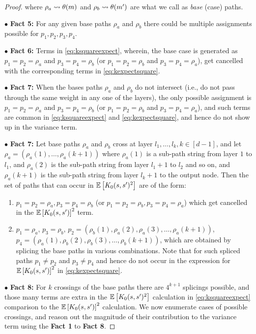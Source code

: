 \begin{proof}
where $\rho_a\rightsquigarrow \theta(m)$ and $\rho_b\rightsquigarrow \theta(m')$ are what we call as \emph{base} (case) paths. 


$\bullet$ \textbf{Fact 5:} For any given base paths $\rho_a$ and $\rho_b$ there could be multiple assignments possible for $p_1,p_2,p_3,p_4$.

$\bullet$ \textbf{Fact 6:}  Terms in \eqref{eq:ksquareexpect}, wherein, the base case is generated as $p_1=p_2=\rho_a$ and $p_3=p_4=\rho_b$ (or $p_1=p_2=\rho_b$ and $p_3=p_4=\rho_a$), get cancelled with the corresponding terms in \eqref{eq:kexpectsquare}.

$\bullet$ \textbf{Fact 7:}  When the bases paths $\rho_a$ and $\rho_b$ do not intersect (i.e., do not pass through the same weight in any one of the layers), the only possible assignment is $p_1=p_2=\rho_a$ and $p_3=p_4=\rho_b$ (or $p_1=p_2=\rho_b$ and $p_3=p_4=\rho_a$), and such terms are common in \eqref{eq:ksquareexpect} and \eqref{eq:kexpectsquare}, and hence do not show up in the variance term.


$\bullet$ \textbf{Fact 7:} Let base paths $\rho_a$ and $\rho_b$ cross at layer $l_1, \ldots, l_k, k \in [d-1]$, and let $\rho_a=(\rho_a(1),\ldots,\rho_a(k+1))$ where $\rho_a(1)$ is a sub-path string from layer $1$ to $l_1$, and $\rho_a(2)$ is the sub-path string from layer $l_1+1$ to $l_2$ and so on, and $\rho_a(k+1)$ is the sub-path string from layer $l_k+1$ to the output node. Then the set of paths that can occur in $\mathbb{E}\left[K_0(s,s')^2\right]$ are of the form:
\begin{enumerate}
\item $p_1=p_2=\rho_a, p_3=p_4=\rho_b$ (or $p_1=p_2=\rho_b, p_3=p_4=\rho_a$) which get cancelled in the $\mathbb{E}\left[K_0(s,s')\right]^2$ term.
\item $p_1=\rho_a$, $p_3=\rho_b$, $p_2=(\rho_b(1),\rho_a(2),\rho_a(3),\ldots,\rho_a(k+1))$, $p_4=(\rho_a(1),\rho_b(2),\rho_b(3),\ldots,\rho_b(k+1))$, which are obtained by splicing the base paths in various combinations. Note that for such spliced paths $p_1\neq p_2$ and $p_3\neq p_4$ and hence do not occur in the expression for $\mathbb{E}\left[K_0(s,s')\right]^2$ in \eqref{eq:kexpectsquare}.
\end{enumerate}


$\bullet$ \textbf{Fact 8:} For $k$ crossings of the base paths there are $4^{k+1}$ splicings possible, and those many terms are extra in the $\mathbb{E}\left[K_0(s,s')^2\right]$ calculation in \eqref{eq:ksquareexpect} comparison to the $\mathbb{E}\left[K_0(s,s')\right]^2$ calculation. We now enumerate cases of possible crossings, and reason out the magnitude of their contribution to the variance term using the \textbf{Fact 1} to \textbf{Fact 8}.



\end{proof}
